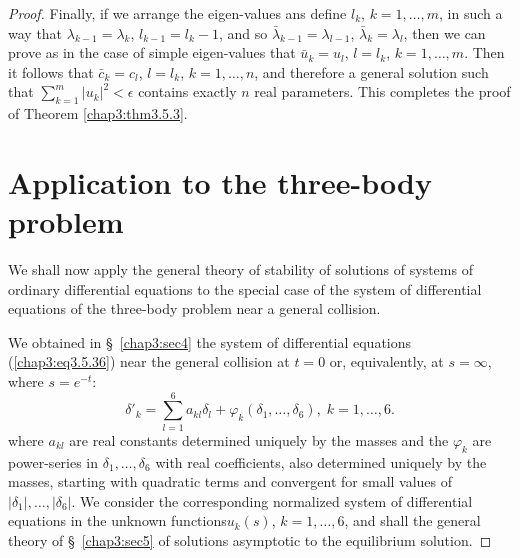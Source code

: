 \begin{proof}
Finally, if we arrange the eigen-values ans define $l_k$, $k=1,
\ldots, m$, in such a way that $\lambda_{k-1} =\lambda_k$, $l_{k-1} =
l_k -1$, and so $\bar{\lambda}_{k-1} = \lambda_{l-1}$,
$\bar{\lambda}_k = \lambda_l$, then we can prove as in the case of
simple eigen-values that $\bar{u}_k = u_l$, $l=l_k$, $k=1, \ldots,
m$. Then it follows that $\bar{c}_k = c_l$, $l=l_k$, $k=1, \ldots, n$,
and therefore a general solution such that $\sum\limits^m_{k=1}
|u_{k}|^2 < \epsilon$ contains exactly $n$ real parameters. This
completes the proof of Theorem \ref{chap3:thm3.5.3}. 

\section{Application to the three-body problem}\label{chap3:sec6}
We shall now apply the general theory of stability of solutions of
systems of ordinary differential equations to the special case of the
system of differential equations of the three-body problem near a
general collision. 

We obtained in \S\ \ref{chap3:sec4} the system of differential
equations (\ref{chap3:eq3.5.36}) near the general collision at $t=0$
or, equivalently, at $s=\infty$, where $s = e^{-t}$: 
\begin{equation*}
\delta'_k = \sum\limits^6_{l=1} a_{kl} \delta_l+ \varphi_k (\delta_1,
\ldots, \delta_6), \; k =1, \ldots,
6. \tag{3.6.1}\label{chap3:eq3.6.1} 
\end{equation*}
where $a_{kl}$ are real constants determined uniquely by the masses
and the $\varphi_k$ are power-series in $\delta_1, \ldots, \delta_6$
with real coefficients, also determined uniquely by the masses,
starting with quadratic terms and convergent for small values of
$|\delta_1|, \ldots, |\delta_6|$. We consider the corresponding
normalized system of differential equations in the unknown
functions\pageoriginale $u_k (s)$, $k=1, \ldots, 6$, and shall the
general theory of \S\ \ref{chap3:sec5} of solutions asymptotic to the
equilibrium solution. 


\end{proof}
